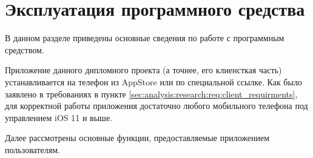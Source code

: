 \section{Эксплуатация программного средства}
\label{sec:usage}

В данном разделе приведены основные сведения по работе с программным средством.

Приложение данного дипломного проекта (а точнее, его клиенсткая часть) устанавливается на телефон из AppStore или по специальной ссылке. Как было заявлено в требованиях в пункте \ref{sec:analysis:research:req:client_requirments}, для корректной работы приложения достаточно любого мобильного телефона под управлением iOS 11 и выше.

Далее рассмотрены основные функции, предоставляемые приложением пользователям.
